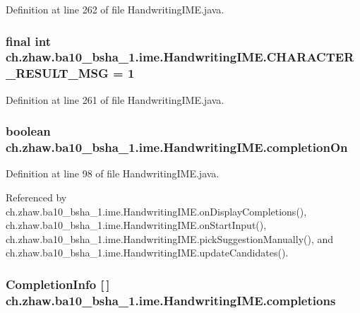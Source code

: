 Definition at line 262 of file HandwritingIME.java.\hypertarget{classch_1_1zhaw_1_1ba10__bsha__1_1_1ime_1_1HandwritingIME_af6448d252df45f5e4ea520c29ec38d0b}{
\subsubsection[{CHARACTER\_\-RESULT\_\-MSG}]{\setlength{\rightskip}{0pt plus 5cm}final int {\bf ch.zhaw.ba10\_\-bsha\_\-1.ime.HandwritingIME.CHARACTER\_\-RESULT\_\-MSG} = 1}}
\label{classch_1_1zhaw_1_1ba10__bsha__1_1_1ime_1_1HandwritingIME_af6448d252df45f5e4ea520c29ec38d0b}


Definition at line 261 of file HandwritingIME.java.\hypertarget{classch_1_1zhaw_1_1ba10__bsha__1_1_1ime_1_1HandwritingIME_ab1ce22088e636ff9cd28e7c5d062471a}{
\subsubsection[{completionOn}]{\setlength{\rightskip}{0pt plus 5cm}boolean {\bf ch.zhaw.ba10\_\-bsha\_\-1.ime.HandwritingIME.completionOn}}}
\label{classch_1_1zhaw_1_1ba10__bsha__1_1_1ime_1_1HandwritingIME_ab1ce22088e636ff9cd28e7c5d062471a}


Definition at line 98 of file HandwritingIME.java.

Referenced by ch.zhaw.ba10\_\-bsha\_\-1.ime.HandwritingIME.onDisplayCompletions(), ch.zhaw.ba10\_\-bsha\_\-1.ime.HandwritingIME.onStartInput(), ch.zhaw.ba10\_\-bsha\_\-1.ime.HandwritingIME.pickSuggestionManually(), and ch.zhaw.ba10\_\-bsha\_\-1.ime.HandwritingIME.updateCandidates().\hypertarget{classch_1_1zhaw_1_1ba10__bsha__1_1_1ime_1_1HandwritingIME_a8df4f47c35084abc7bf31d65b248c5be}{
\subsubsection[{completions}]{\setlength{\rightskip}{0pt plus 5cm}CompletionInfo \mbox{[}$\,$\mbox{]} {\bf ch.zhaw.ba10\_\-bsha\_\-1.ime.HandwritingIME.completions}}}
\label{classch_1_1zhaw_1_1ba10__bsha__1_1_1ime_1_1HandwritingIME_a8df4f47c35084abc7bf31d65b248c5be}



